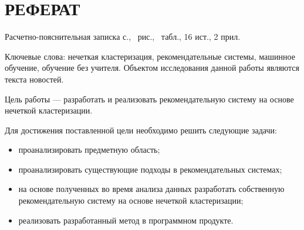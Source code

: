 \section*{РЕФЕРАТ}

Расчетно-пояснительная записка \pageref{LastPage} с., \totalfigures\ рис., \totaltables\ табл., 16 ист., 2 прил.

Ключевые слова: нечеткая кластеризация, рекомендательные системы, машинное обучение, обучение без учителя.
Объектом исследования данной работы являются текста новостей.

Цель работы — разработать и реализовать рекомендательную систему на основе нечеткой кластеризации.
      
Для достижения поставленной цели необходимо решить следующие задачи:      
\begin{itemize}
	\item проанализировать предметную область;
	\item проанализировать существующие подходы в рекомендательных системах;
	\item на основе полученных во время анализа данных разработать собственную рекомендательную систему на основе нечеткой кластеризации;
	\item реализовать разработанный метод в программном продукте.
\end{itemize}

\pagebreak